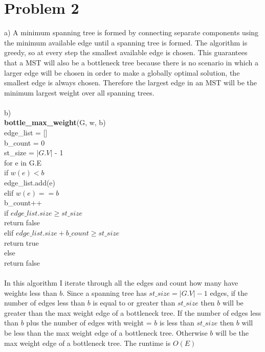 \documentclass{article}
\begin{document}
\section*{Problem 2}
a) A minimum spanning tree is formed by connecting separate components using the minimum available edge until a spanning tree is formed.  The algorithm is greedy, so at every step the smallest available edge is chosen.  This guarantees that a MST will also be a bottleneck tree because there is no scenario in which a larger edge will be chosen in order to make a globally optimal solution, the smallest edge is always chosen.  Therefore the largest edge in an MST will be the minimum largest weight over all spanning trees.\\\\
b) \\
\textbf{bottle\_max\_weight}(G, w, b)\\
\-\hspace{.5cm}edge\_list = []\\
\-\hspace{.5cm}b\_count = 0\\
\-\hspace{.5cm}st\_size = $|G.V|$ - 1\\
\-\hspace{.5cm}for e in G.E\\
\-\hspace{1cm}if $w(e) < b$\\
\-\hspace{1.5cm}edge\_list.add(e)\\
\-\hspace{1cm}elif $w(e) == b$\\
\-\hspace{1.5cm}b\_count++\\
\-\hspace{.5cm}if $edge\_list.size \geq st\_size$\\
\-\hspace{1cm}return false\\
\-\hspace{.5cm}elif $edge\_list.size + b\_count \geq st\_size$\\
\-\hspace{1cm}return true\\
\-\hspace{.5cm}else\\
\-\hspace{1cm}return false\\\\
In this algorithm I iterate through all the edges and count how many have weights less than $b$.  Since a spanning tree has $st\_size = |G.V| - 1$ edges, if the number of edges less than $b$ is equal to or greater than $st\_size$ then $b$ will be greater than the max weight edge of a bottleneck tree.  If the number of edges less than $b$ plus the number of edges with weight = $b$ is less than $st\_size$ then $b$ will be less than the max weight edge of a bottleneck tree.  Otherwise $b$ will be the max weight edge of a bottleneck tree.  The runtime is $O(E)$\\\\\\\\\\
\end{document}
